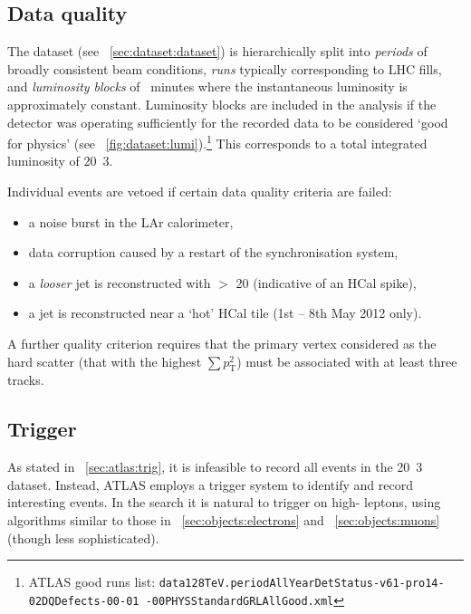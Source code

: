 
\subsection{Data quality}
\label{sec:selection:quality}

The \pp dataset (see \Section~\ref{sec:dataset:dataset}) is hierarchically split into 
\textit{periods} of broadly consistent beam conditions, \textit{runs} typically 
corresponding to LHC fills, and \textit{luminosity blocks} of ~minutes where the 
instantaneous luminosity is approximately constant. Luminosity blocks are included in the 
analysis if the detector was operating sufficiently for the recorded data to be 
considered `good for physics' (see \Figure~\ref{fig:dataset:lumi}).\footnote{
	ATLAS good runs list: \texttt{data128TeV.periodAllYearDetStatus-v61-pro14-02DQDefects-00-01
	-00PHYSStandardGRLAllGood.xml}
} 
This corresponds to a total integrated luminosity of \unit{20.3}{\invfb}.

Individual events are vetoed if certain data quality criteria are failed:
\begin{itemize}[noitemsep,nolistsep]
	\item a noise burst in the LAr calorimeter,
	\item data corruption caused by a restart of the synchronisation system,
	\item a \textit{looser} jet is reconstructed with \pt $>$ \unit{20}{\GeV} (indicative of an HCal spike),
	\item a jet is reconstructed near a `hot' HCal tile (1st -- 8th May 2012 only).
\end{itemize}
A further quality criterion requires that the primary vertex considered as the hard 
scatter (that with the highest $\sum p_{\text{T}}^2$) must be associated with at least 
three tracks.



\subsection{Trigger}
\label{sec:selection:trigger}

As stated in \Section~\ref{sec:atlas:trig}, it is infeasible to record all events in the 
\unit{20.3}{\invfb} dataset. Instead, ATLAS employs a trigger system to identify and 
record interesting events. In the \HWWlvlv search it is natural to trigger on high-\pt 
leptons, using algorithms similar to those in \Section~\ref{sec:objects:electrons} and 
\Section~\ref{sec:objects:muons} (though less sophisticated).

